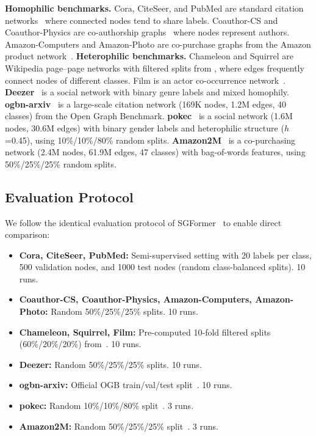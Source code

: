 \noindent\textbf{Homophilic benchmarks.} Cora, CiteSeer, and PubMed are standard citation networks~\citep{kipf2017semi, sen2008collective} where connected nodes tend to share labels. Coauthor-CS and Coauthor-Physics are co-authorship graphs~\citep{shchur2018pitfalls} where nodes represent authors. Amazon-Computers and Amazon-Photo are co-purchase graphs from the Amazon product network~\citep{shchur2018pitfalls}.
\textbf{Heterophilic benchmarks.} Chameleon and Squirrel are Wikipedia page--page networks with filtered splits from \citet{platonov2023critical}, where edges frequently connect nodes of different classes. Film is an actor co-occurrence network~\citep{pei2020geomgcn}. \textbf{Deezer}~\citep{rozemberczki2021deezer} is a social network with binary genre labels and mixed homophily.
\textbf{ogbn-arxiv}~\citep{hu2020ogb} is a large-scale citation network (169K nodes, 1.2M edges, 40 classes) from the Open Graph Benchmark.
\textbf{pokec}~\citep{lim2021large} is a social network (1.6M nodes, 30.6M edges) with binary gender labels and heterophilic structure ($h$=0.45), using 10\%/10\%/80\% random splits.
\textbf{Amazon2M}~\citep{wu2022nodeformer} is a co-purchasing network (2.4M nodes, 61.9M edges, 47 classes) with bag-of-words features, using 50\%/25\%/25\% random splits.

\subsection{Evaluation Protocol}

We follow the identical evaluation protocol of SGFormer~\citep{wu2023sgformer} to enable direct comparison:

\begin{itemize}
    \item \textbf{Cora, CiteSeer, PubMed:} Semi-supervised setting with 20 labels per class, 500 validation nodes, and 1000 test nodes (random class-balanced splits). 10 runs.
    \item \textbf{Coauthor-CS, Coauthor-Physics, Amazon-Computers, Amazon-Photo:} Random 50\%/25\%/25\% splits. 10 runs.
    \item \textbf{Chameleon, Squirrel, Film:} Pre-computed 10-fold filtered splits (60\%/20\%/20\%) from~\citet{platonov2023critical}. 10 runs.
    \item \textbf{Deezer:} Random 50\%/25\%/25\% splits. 10 runs.
    \item \textbf{ogbn-arxiv:} Official OGB train/val/test split~\citep{hu2020ogb}. 10 runs.
    \item \textbf{pokec:} Random 10\%/10\%/80\% split~\citep{lim2021large}. 3 runs.
    \item \textbf{Amazon2M:} Random 50\%/25\%/25\% split~\citep{wu2022nodeformer}. 3 runs.
\end{itemize}

